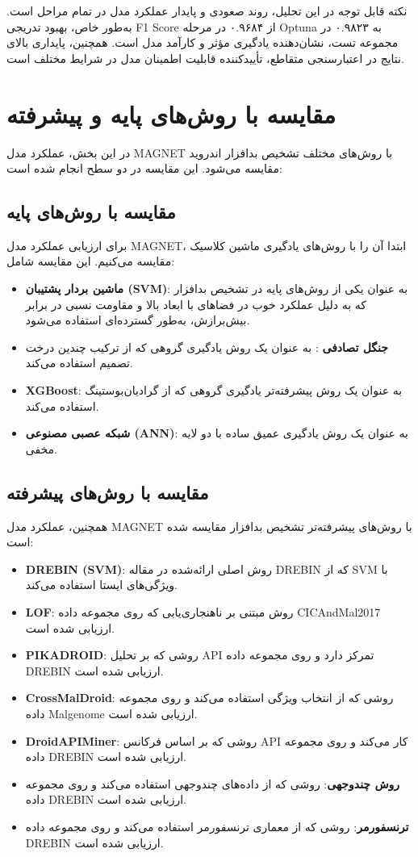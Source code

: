 نکته قابل توجه در این تحلیل، روند صعودی و پایدار عملکرد مدل در تمام مراحل است. به‌طور خاص، بهبود تدریجی F1 Score از ۰.۹۶۸۴ در مرحله Optuna به ۰.۹۸۲۳ در مجموعه تست، نشان‌دهنده یادگیری مؤثر و کارآمد مدل است. همچنین، پایداری بالای نتایج در اعتبارسنجی متقاطع، تأییدکننده قابلیت اطمینان مدل در شرایط مختلف است.

\section{مقایسه با روش‌های پایه و پیشرفته}
در این بخش، عملکرد مدل MAGNET با روش‌های مختلف تشخیص بدافزار اندروید مقایسه می‌شود. این مقایسه در دو سطح انجام شده است:

\subsection{مقایسه با روش‌های پایه}
برای ارزیابی عملکرد مدل MAGNET، ابتدا آن را با روش‌های یادگیری ماشین کلاسیک مقایسه می‌کنیم. این مقایسه شامل:
\begin{itemize}
    \item \textbf{ماشین بردار پشتیبان (SVM)}: به عنوان یکی از روش‌های پایه در تشخیص بدافزار که به دلیل عملکرد خوب در فضاهای با ابعاد بالا و مقاومت نسبی در برابر بیش‌برازش، به‌طور گسترده‌ای استفاده می‌شود.
    \item \textbf{جنگل تصادفی }: به عنوان یک روش یادگیری گروهی که از ترکیب چندین درخت تصمیم استفاده می‌کند.
    \item \textbf{XGBoost}: به عنوان یک روش پیشرفته‌تر یادگیری گروهی که از گرادیان‌بوستینگ استفاده می‌کند.
    \item \textbf{شبکه عصبی مصنوعی (ANN)}: به عنوان یک روش یادگیری عمیق ساده با دو لایه مخفی.
\end{itemize}

\subsection{مقایسه با روش‌های پیشرفته}
همچنین، عملکرد مدل MAGNET با روش‌های پیشرفته‌تر تشخیص بدافزار مقایسه شده است:
\begin{itemize}
    \item \textbf{DREBIN (SVM)}: روش اصلی ارائه‌شده در مقاله DREBIN که از SVM با ویژگی‌های ایستا استفاده می‌کند.
    \item \textbf{LOF}: روش مبتنی بر ناهنجاری‌یابی که روی مجموعه داده CICAndMal2017 ارزیابی شده است.
    \item \textbf{PIKADROID}: روشی که بر تحلیل API تمرکز دارد و روی مجموعه داده DREBIN ارزیابی شده است.
    \item \textbf{CrossMalDroid}: روشی که از انتخاب ویژگی استفاده می‌کند و روی مجموعه داده Malgenome ارزیابی شده است.
    \item \textbf{DroidAPIMiner}: روشی که بر اساس فرکانس API کار می‌کند و روی مجموعه داده DREBIN ارزیابی شده است.
    \item \textbf{روش چندوجهی}: روشی که از داده‌های چندوجهی استفاده می‌کند و روی مجموعه داده DREBIN ارزیابی شده است.
    \item \textbf{ترنسفورمر}: روشی که از معماری ترنسفورمر استفاده می‌کند و روی مجموعه داده DREBIN ارزیابی شده است.
\end{itemize}

